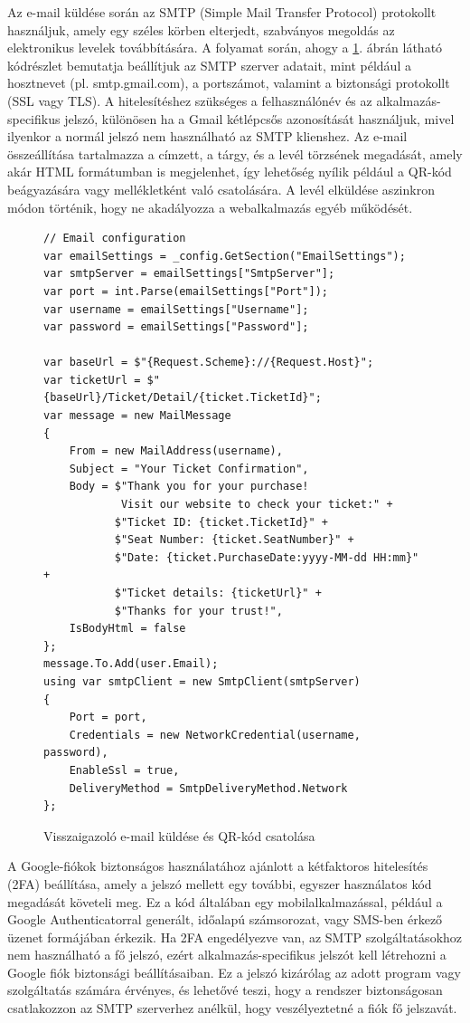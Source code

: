 Az e-mail küldése során az SMTP (Simple Mail Transfer Protocol) protokollt használjuk, amely egy széles körben elterjedt, szabványos megoldás az elektronikus levelek továbbítására. A folyamat során, ahogy a \ref{fig:send-ticket-email}. ábrán látható kódrészlet bemutatja beállítjuk az SMTP szerver adatait, mint például a hosztnevet (pl. smtp.gmail.com), a portszámot, valamint a biztonsági protokollt (SSL vagy TLS). A hitelesítéshez szükséges a felhasználónév és az alkalmazás-specifikus jelszó, különösen ha a Gmail kétlépcsős azonosítását használjuk, mivel ilyenkor a normál jelszó nem használható az SMTP klienshez. Az e-mail összeállítása tartalmazza a címzett, a tárgy, és a levél törzsének megadását, amely akár HTML formátumban is megjelenhet, így lehetőség nyílik például a QR-kód beágyazására vagy mellékletként való csatolására. A levél elküldése aszinkron módon történik, hogy ne akadályozza a webalkalmazás egyéb működését.
\begin{figure}[H]
\caption{Visszaigazoló e-mail küldése és QR-kód csatolása}
\label{fig:send-ticket-email}
\begin{minipage}{\textwidth}
\begin{BVerbatim}
// Email configuration
var emailSettings = _config.GetSection("EmailSettings");
var smtpServer = emailSettings["SmtpServer"];
var port = int.Parse(emailSettings["Port"]);
var username = emailSettings["Username"];
var password = emailSettings["Password"];

var baseUrl = $"{Request.Scheme}://{Request.Host}";
var ticketUrl = $"{baseUrl}/Ticket/Detail/{ticket.TicketId}";
var message = new MailMessage
{
    From = new MailAddress(username),
    Subject = "Your Ticket Confirmation",
    Body = $"Thank you for your purchase!
            Visit our website to check your ticket:" +
           $"Ticket ID: {ticket.TicketId}" +
           $"Seat Number: {ticket.SeatNumber}" +
           $"Date: {ticket.PurchaseDate:yyyy-MM-dd HH:mm}" +
           $"Ticket details: {ticketUrl}" +
           $"Thanks for your trust!",
    IsBodyHtml = false
};
message.To.Add(user.Email);
using var smtpClient = new SmtpClient(smtpServer)
{
    Port = port,
    Credentials = new NetworkCredential(username, password),
    EnableSsl = true,
    DeliveryMethod = SmtpDeliveryMethod.Network
};
\end{BVerbatim}
\end{minipage}
\end{figure}
A Google-fiókok biztonságos használatához ajánlott a kétfaktoros hitelesítés (2FA) beállítása, amely a jelszó mellett egy további, egyszer használatos kód megadását követeli meg. Ez a kód általában egy mobilalkalmazással, például a Google Authenticatorral generált, időalapú számsorozat, vagy SMS-ben érkező üzenet formájában érkezik. Ha 2FA engedélyezve van, az SMTP szolgáltatásokhoz nem használható a fő jelszó, ezért alkalmazás-specifikus jelszót kell létrehozni a Google fiók biztonsági beállításaiban. Ez a jelszó kizárólag az adott program vagy szolgáltatás számára érvényes, és lehetővé teszi, hogy a rendszer biztonságosan csatlakozzon az SMTP szerverhez anélkül, hogy veszélyeztetné a fiók fő jelszavát.

